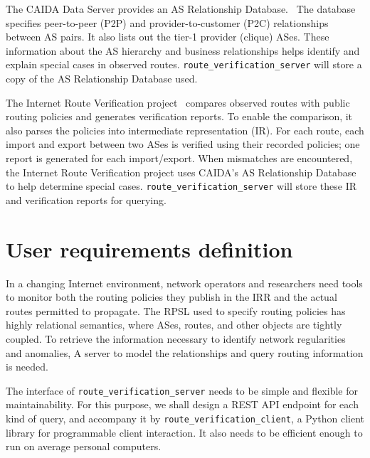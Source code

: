 \documentclass[12pt]{article}
\begin{document}
The CAIDA Data Server provides an AS Relationship Database.~\cite{index2023}
The database specifies peer-to-peer (P2P) and provider-to-customer (P2C)
relationships between AS pairs.
It also lists out the tier-1 provider (clique) ASes.
These information about the AS hierarchy and business relationships helps
identify and explain special cases in observed routes.
\verb|route_verification_server| will store a copy of the
AS Relationship Database used.

The Internet Route Verification project~\cite{internet2023he}
compares observed routes with public routing policies and
generates verification reports.
To enable the comparison,
it also parses the policies into intermediate representation (IR).
For each route,
each import and export between two ASes is verified using
their recorded policies;
one report is generated for each import/export.
When mismatches are encountered,
the Internet Route Verification project uses
CAIDA's AS Relationship Database to help determine special cases.
\verb|route_verification_server| will store these IR and
verification reports for querying.

\section{User requirements definition}

In a changing Internet environment,
network operators and researchers need tools to monitor both
the routing policies they publish in the IRR and
the actual routes permitted to propagate.
The RPSL used to specify routing policies has highly relational semantics,
where ASes, routes, and other objects are tightly coupled.
To retrieve the information necessary to identify network regularities and anomalies,
A server to model the relationships and query routing information is needed.

The interface of \verb|route_verification_server| needs to
be simple and flexible for maintainability.
For this purpose,
we shall design a REST API endpoint for each kind of query,
and accompany it by \verb|route_verification_client|,
a Python client library for programmable client interaction.
It also needs to be efficient enough to run on average personal computers.

\end{document}
